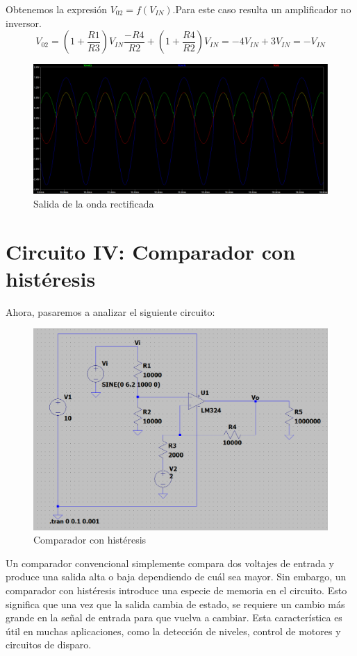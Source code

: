 \documentclass[12pt]{article}
\begin{document}
	Obtenemos la expresión  $V_{02}=f(V_{IN})$.Para este caso resulta un amplificador no inversor.
	\begin{equation}
		V_{02}=(1+\frac{R1}{R3})V_{IN}\frac{-R4}{R2}+(1+\frac{R4}{R2})V_{IN}=-4V_{IN}+3V_{IN}=-V_{IN}
	\end{equation}
	
	\begin{figure}[h!]
		\includegraphics[width=\linewidth]{Simulaciones-Resultados/Circuito3_Vo1(Vin)-Vo2(Vin)}
		\caption[Salida de la onda rectificada]{Salida de la onda rectificada}
		\label{fig:circuito3vo1vin-vo2vin}
	\end{figure}
	
	\section{Circuito IV: Comparador con histéresis}
	Ahora, pasaremos a analizar el siguiente circuito:
	\begin{figure}[h!]
		\centering
		\includegraphics[width=1\linewidth]{Simulaciones-Resultados/Circuito4_esquematico}
		\caption{Comparador con histéresis}
		\label{fig:circuito4esquematico}
	\end{figure}
	Un comparador convencional simplemente compara dos voltajes de entrada y produce una salida alta o baja dependiendo de cuál sea mayor. Sin embargo, un comparador con histéresis introduce una especie de memoria en el circuito. Esto significa que una vez que la salida cambia de estado, se requiere un cambio más grande en la señal de entrada para que vuelva a cambiar. Esta característica es útil en muchas aplicaciones, como la detección de niveles, control de motores y circuitos de disparo.
	
\end{document}
